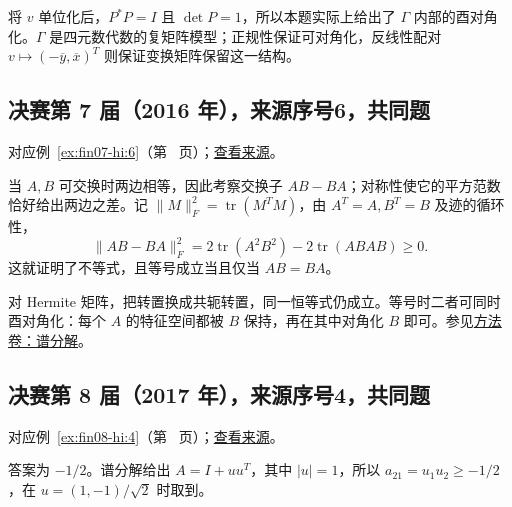\documentclass[UTF8,12pt,a4paper,fontset=fandol]{ctexart}
\begin{document}
\begin{remark}[方法与条件]

将 $v$ 单位化后，$P^*P=I$ 且 $\det P=1$，所以本题实际上给出了 $\Gamma$ 内部的酉对角化。$\Gamma$ 是四元数代数的复矩阵模型；正规性保证可对角化，反线性配对 $v\mapsto(-\overline y,\overline x)^T$ 则保证变换矩阵保留这一结构。

\end{remark}

\subsection{决赛第 7 届（2016 年），来源序号6，共同题}\label{ans:fin07-hi:6}\label{pr:fin07-hi:6}

对应例~\ref{ex:fin07-hi:6}（第~\pageref{ex:fin07-hi:6} 页）；\href{https://github.com/lzxcr/cmc-mathematics/blob/64916fa1fdbc3e444a652eca204d5669058ee321/src/problems/finals/07/06.md}{查看来源}。

\begin{solve}

当 $A,B$ 可交换时两边相等，因此考察交换子 $AB-BA$；对称性使它的平方范数恰好给出两边之差。记 $\|M\|_F^2=\operatorname{tr}(M^TM)$，由 $A^T=A,B^T=B$ 及迹的循环性，
\[
\|AB-BA\|_F^2=2\operatorname{tr}(A^2B^2)-2\operatorname{tr}(ABAB)\geq0.
\]
这就证明了不等式，且等号成立当且仅当 $AB=BA$。

\end{solve}

\begin{remark}[方法与条件]

对 Hermite 矩阵，把转置换成共轭转置，同一恒等式仍成立。等号时二者可同时酉对角化：每个 $A$ 的特征空间都被 $B$ 保持，再在其中对角化 $B$ 即可。参见\hyperref[app:linear-spectral]{方法卷：谱分解}。

\end{remark}

\subsection{决赛第 8 届（2017 年），来源序号4，共同题}\label{ans:fin08-hi:4}\label{pr:fin08-hi:4}

对应例~\ref{ex:fin08-hi:4}（第~\pageref{ex:fin08-hi:4} 页）；\href{https://github.com/lzxcr/cmc-mathematics/blob/64916fa1fdbc3e444a652eca204d5669058ee321/src/problems/finals/08/04.md}{查看来源}。

\begin{solve}

答案为 $-1/2$。谱分解给出 $A=I+uu^T$，其中 $|u|=1$，所以 $a_{21}=u_1u_2\geq-1/2$，在 $u=(1,-1)/\sqrt2$ 时取到。

\end{solve}
\end{document}
